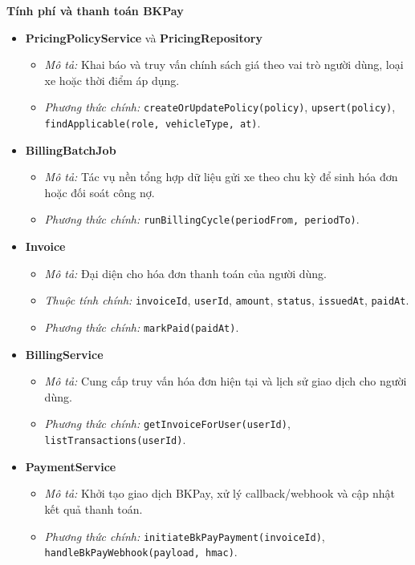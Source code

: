 \newpage
\noindent\textbf{Tính phí và thanh toán BKPay}
\begin{itemize}[leftmargin=1.5cm]
    \item \textbf{PricingPolicyService} và \textbf{PricingRepository}
    \begin{itemize}
        \item \textit{Mô tả:} Khai báo và truy vấn chính sách giá theo vai trò người dùng, loại xe hoặc thời điểm áp dụng.
        \item \textit{Phương thức chính:} \texttt{createOrUpdatePolicy(policy)}, \texttt{upsert(policy)}, \texttt{findApplicable(role, vehicleType, at)}.
    \end{itemize}

    \item \textbf{BillingBatchJob}
    \begin{itemize}
        \item \textit{Mô tả:} Tác vụ nền tổng hợp dữ liệu gửi xe theo chu kỳ để sinh hóa đơn hoặc đối soát công nợ.
        \item \textit{Phương thức chính:} \texttt{runBillingCycle(periodFrom, periodTo)}.
    \end{itemize}

    \item \textbf{Invoice}
    \begin{itemize}
        \item \textit{Mô tả:} Đại diện cho hóa đơn thanh toán của người dùng.
        \item \textit{Thuộc tính chính:} \texttt{invoiceId}, \texttt{userId}, \texttt{amount}, \texttt{status}, \texttt{issuedAt}, \texttt{paidAt}.
        \item \textit{Phương thức chính:} \texttt{markPaid(paidAt)}.
    \end{itemize}

    \item \textbf{BillingService}
    \begin{itemize}
        \item \textit{Mô tả:} Cung cấp truy vấn hóa đơn hiện tại và lịch sử giao dịch cho người dùng.
        \item \textit{Phương thức chính:} \texttt{getInvoiceForUser(userId)}, \texttt{listTransactions(userId)}.
    \end{itemize}

    \item \textbf{PaymentService}
    \begin{itemize}
        \item \textit{Mô tả:} Khởi tạo giao dịch BKPay, xử lý callback/webhook và cập nhật kết quả thanh toán.
        \item \textit{Phương thức chính:} \texttt{initiateBkPayPayment(invoiceId)}, \texttt{handleBkPayWebhook(payload, hmac)}.
    \end{itemize}


\end{itemize}

